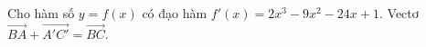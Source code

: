 \documentclass{article}
\begin{document}
Cho hàm số $y = f(x)$ có đạo hàm $f'(x) = 2x^3 - 9x^2 - 24x + 1$. Vectơ $\vec{BA} + \vec{A'C'} = \vec{BC}$.
\end{document}
